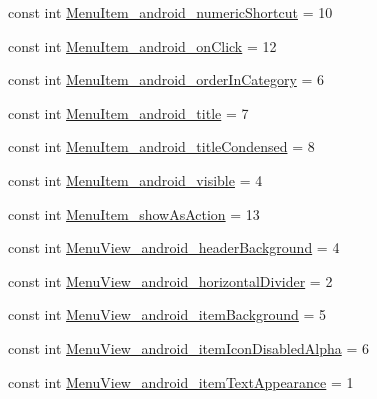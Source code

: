 \begin{DoxyCompactItemize}
\item 
const int \mbox{\hyperlink{class_f_w_p_s___app_1_1_droid_1_1_resource_1_1_styleable_a1c3b5c9b34e7bd36b8272fb3dfa2c55f}{Menu\+Item\+\_\+android\+\_\+numeric\+Shortcut}} = 10
\item 
const int \mbox{\hyperlink{class_f_w_p_s___app_1_1_droid_1_1_resource_1_1_styleable_ac233f3eea4eb81ab474170b11aa3bae7}{Menu\+Item\+\_\+android\+\_\+on\+Click}} = 12
\item 
const int \mbox{\hyperlink{class_f_w_p_s___app_1_1_droid_1_1_resource_1_1_styleable_a5cf49a255c23e494dfe7a00ea172b565}{Menu\+Item\+\_\+android\+\_\+order\+In\+Category}} = 6
\item 
const int \mbox{\hyperlink{class_f_w_p_s___app_1_1_droid_1_1_resource_1_1_styleable_aca1c71c5e29a327a088a81d295d0bf83}{Menu\+Item\+\_\+android\+\_\+title}} = 7
\item 
const int \mbox{\hyperlink{class_f_w_p_s___app_1_1_droid_1_1_resource_1_1_styleable_a2a70b6ba19dc0b074f95bbbea9c72cc2}{Menu\+Item\+\_\+android\+\_\+title\+Condensed}} = 8
\item 
const int \mbox{\hyperlink{class_f_w_p_s___app_1_1_droid_1_1_resource_1_1_styleable_ade26778920f338bfcf800d1d4b9d0c78}{Menu\+Item\+\_\+android\+\_\+visible}} = 4
\item 
const int \mbox{\hyperlink{class_f_w_p_s___app_1_1_droid_1_1_resource_1_1_styleable_ac42815e91a91f5d7561bfe696a494771}{Menu\+Item\+\_\+show\+As\+Action}} = 13
\item 
const int \mbox{\hyperlink{class_f_w_p_s___app_1_1_droid_1_1_resource_1_1_styleable_afee5903739111c8b55df9e33b4a9fefc}{Menu\+View\+\_\+android\+\_\+header\+Background}} = 4
\item 
const int \mbox{\hyperlink{class_f_w_p_s___app_1_1_droid_1_1_resource_1_1_styleable_ac9b8b5433fc5c87dd22336dea8233661}{Menu\+View\+\_\+android\+\_\+horizontal\+Divider}} = 2
\item 
const int \mbox{\hyperlink{class_f_w_p_s___app_1_1_droid_1_1_resource_1_1_styleable_ab5b49cd4e03c76bf60ea1833ada1dc87}{Menu\+View\+\_\+android\+\_\+item\+Background}} = 5
\item 
const int \mbox{\hyperlink{class_f_w_p_s___app_1_1_droid_1_1_resource_1_1_styleable_a58ca8ee9228dc285f7de6570fd4c5210}{Menu\+View\+\_\+android\+\_\+item\+Icon\+Disabled\+Alpha}} = 6
\item 
const int \mbox{\hyperlink{class_f_w_p_s___app_1_1_droid_1_1_resource_1_1_styleable_a86ed31bf061d75cd54d95aa865f5cebe}{Menu\+View\+\_\+android\+\_\+item\+Text\+Appearance}} = 1

\end{DoxyCompactItemize}
